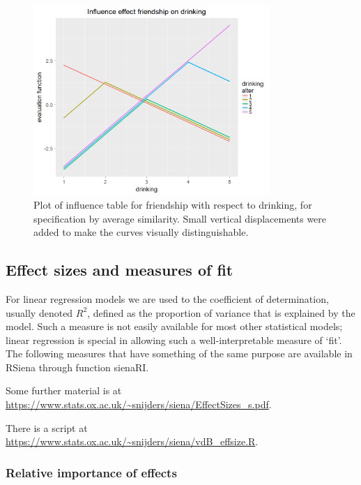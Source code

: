 \documentclass[a4paper,fleqn,11pt]{article}
\newcommand{\+}{\, + \,}
\newcommand{\sfn}[1]{\textsf{#1}}
\newcommand{\RS}{{\sf \textsf{RSiena} }}
\begin{document}
\begin{figure}[hb]
  \centering
  \includegraphics[width=0.8\textwidth]{influenceTable_s_drinking.png}
  \caption{Plot of influence table  for friendship with respect to drinking,\protect\newline
  for specification by average similarity.
  \protect\newline Small vertical displacements
  were added to make the curves visually distinguishable.}
  \label{F_infl_dk_avsim}
\end{figure}

\clearpage

\subsection{Effect sizes and measures of fit}

For linear regression models we are used to the coefficient of determination,
usually denoted $R^2$, defined as the proportion of variance
that is explained by the model.
Such a measure is not easily available for most other statistical models;
linear regression is special in allowing such a well-interpretable
measure of `fit'.
The following measures that have something of the same purpose
are available in \RS through function  \sfn{sienaRI}.

Some further material is at \\
\url{https://www.stats.ox.ac.uk/~snijders/siena/EffectSizes_s.pdf}.

There is a script at \\
\url{https://www.stats.ox.ac.uk/~snijders/siena/vdB_effsize.R}.

\subsubsection{Relative importance of effects}
\end{document}
